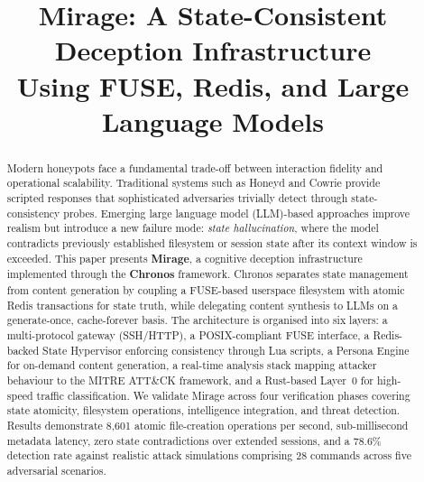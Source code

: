 \documentclass[conference]{IEEEtran}
\begin{document}
\title{Mirage: A State-Consistent Deception Infrastructure\\Using FUSE, Redis, and Large Language Models}

\author{
}

\maketitle

\begin{abstract}
Modern honeypots face a fundamental trade-off between interaction fidelity and operational scalability.
Traditional systems such as Honeyd and Cowrie provide scripted responses that sophisticated adversaries trivially detect through state-consistency probes.
Emerging large language model (LLM)-based approaches improve realism but introduce a new failure mode: \emph{state hallucination}, where the model contradicts previously established filesystem or session state after its context window is exceeded.
This paper presents \textbf{Mirage}, a cognitive deception infrastructure implemented through the \textbf{Chronos} framework.
Chronos separates state management from content generation by coupling a FUSE-based userspace filesystem with atomic Redis transactions for state truth, while delegating content synthesis to LLMs on a generate-once, cache-forever basis.
The architecture is organised into six layers: a multi-protocol gateway (SSH/HTTP), a POSIX-compliant FUSE interface, a Redis-backed State Hypervisor enforcing consistency through Lua scripts, a Persona Engine for on-demand content generation, a real-time analysis stack mapping attacker behaviour to the MITRE ATT\&CK framework, and a Rust-based Layer~0 for high-speed traffic classification.
We validate Mirage across four verification phases covering state atomicity, filesystem operations, intelligence integration, and threat detection.
Results demonstrate 8{,}601 atomic file-creation operations per second, sub-millisecond metadata latency, zero state contradictions over extended sessions, and a 78.6\% detection rate against realistic attack simulations comprising 28 commands across five adversarial scenarios.
\end{abstract}
\end{document}
